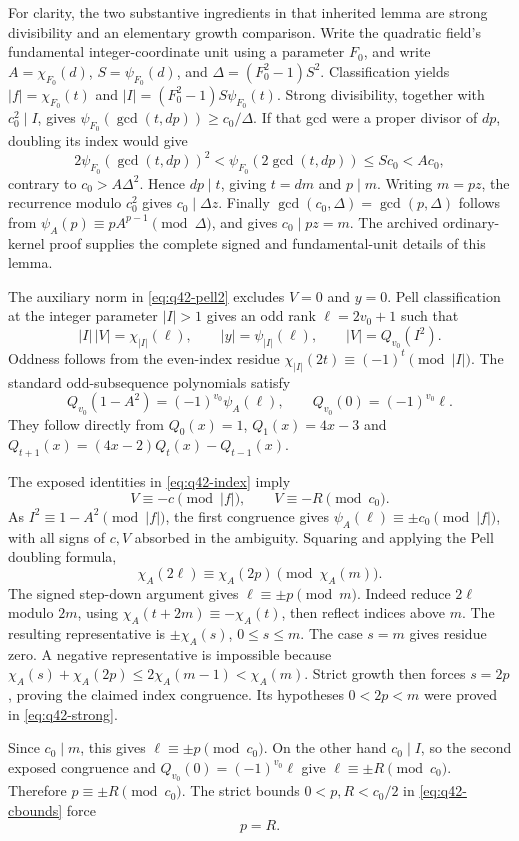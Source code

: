 For clarity, the two substantive ingredients in that inherited lemma are
strong divisibility and an elementary growth comparison. Write the
quadratic field's fundamental integer-coordinate unit using a parameter
$F_0$, and write $A=\chi_{F_0}(d)$,
$S=\psi_{F_0}(d)$, and
$\Delta=(F_0^2-1)S^2$. Classification yields
$|f|=\chi_{F_0}(t)$ and
$|I|=(F_0^2-1)S\psi_{F_0}(t)$.
Strong divisibility, together with $c_0^2\mid I$, gives
$\psi_{F_0}(\gcd(t,dp))\ge c_0/\Delta$.
If that gcd were a proper divisor of $dp$, doubling its index would give
\[
 2\psi_{F_0}(\gcd(t,dp))^2
   <\psi_{F_0}(2\gcd(t,dp))
   \le S c_0<A c_0,
\]
contrary to $c_0>A\Delta^2$. Hence $dp\mid t$, giving
$t=dm$ and $p\mid m$. Writing $m=pz$, the recurrence modulo $c_0^2$
gives $c_0\mid\Delta z$. Finally
$\gcd(c_0,\Delta)=\gcd(p,\Delta)$ follows from
$\psi_A(p)\equiv pA^{p-1}\pmod\Delta$, and gives $c_0\mid pz=m$.
The archived ordinary-kernel proof supplies the complete signed and
fundamental-unit details of this lemma.

The auxiliary norm in \eqref{eq:q42-pell2} excludes $V=0$ and $y=0$.
Pell classification at the integer parameter $|I|>1$ gives an odd rank
$\ell=2v_0+1$ such that
\[
 |I|\,|V|=\chi_{|I|}(\ell),\qquad
 |y|=\psi_{|I|}(\ell),\qquad |V|=Q_{v_0}(I^2).
\]
Oddness follows from the even-index residue
$\chi_{|I|}(2t)\equiv(-1)^t\pmod{|I|}$.
The standard odd-subsequence polynomials satisfy
\[
 Q_{v_0}(1-A^2)=(-1)^{v_0}\psi_A(\ell),
 \qquad Q_{v_0}(0)=(-1)^{v_0}\ell.
\]
They follow directly from $Q_0(x)=1$, $Q_1(x)=4x-3$ and
$Q_{t+1}(x)=(4x-2)Q_t(x)-Q_{t-1}(x)$.

The exposed identities in \eqref{eq:q42-index} imply
\[
 V\equiv-c\pmod{|f|},\qquad V\equiv-R\pmod{c_0}.
\]
As $I^2\equiv1-A^2\pmod{|f|}$, the first congruence gives
$\psi_A(\ell)\equiv\pm c_0\pmod{|f|}$, with all signs of $c,V$
absorbed in the ambiguity. Squaring and applying the Pell doubling formula,
\[
 \chi_A(2\ell)\equiv\chi_A(2p)\pmod{\chi_A(m)}.
\]
The signed step-down argument gives $\ell\equiv\pm p\pmod m$.
Indeed reduce $2\ell$ modulo $2m$, using
$\chi_A(t+2m)\equiv-\chi_A(t)$, then reflect indices above $m$.
The resulting representative is $\pm\chi_A(s)$, $0\le s\le m$.
The case $s=m$ gives residue zero. A negative representative is impossible
because
$\chi_A(s)+\chi_A(2p)\le2\chi_A(m-1)<\chi_A(m)$.
Strict growth then forces $s=2p$, proving the claimed index congruence.
Its hypotheses $0<2p<m$ were proved in \eqref{eq:q42-strong}.

Since $c_0\mid m$, this gives $\ell\equiv\pm p\pmod{c_0}$.
On the other hand $c_0\mid I$, so the second exposed congruence and
$Q_{v_0}(0)=(-1)^{v_0}\ell$ give
$\ell\equiv\pm R\pmod{c_0}$. Therefore
$p\equiv\pm R\pmod{c_0}$. The strict bounds
$0<p,R<c_0/2$ in \eqref{eq:q42-cbounds} force
\begin{equation}
 p=R.
 \label{eq:q42-mainrank}
\end{equation}

